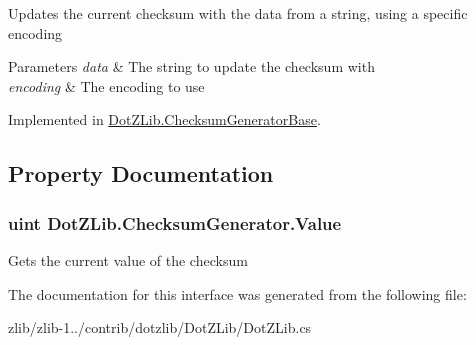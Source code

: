 Updates the current checksum with the data from a string, using a specific encoding 


\begin{DoxyParams}{Parameters}
{\em data} & The string to update the checksum with\\
\hline
{\em encoding} & The encoding to use\\
\hline
\end{DoxyParams}


Implemented in \hyperlink{class_dot_z_lib_1_1_checksum_generator_base_ad8e1adfbbfcc12ab74c772f3292bfee3}{Dot\+Z\+Lib.\+Checksum\+Generator\+Base}.



\subsection{Property Documentation}
\hypertarget{interface_dot_z_lib_1_1_checksum_generator_a1e919ad45b3074b52deb14f3fc72cf20}{
\subsubsection[{Value}]{\setlength{\rightskip}{0pt plus 5cm}uint Dot\+Z\+Lib.\+Checksum\+Generator.\+Value\hspace{0.3cm}{\ttfamily [get]}}}\label{interface_dot_z_lib_1_1_checksum_generator_a1e919ad45b3074b52deb14f3fc72cf20}


Gets the current value of the checksum 



The documentation for this interface was generated from the following file\+:\begin{DoxyCompactItemize}
\item 
zlib/zlib-\/1../contrib/dotzlib/\+Dot\+Z\+Lib/Dot\+Z\+Lib.\+cs\end{DoxyCompactItemize}
